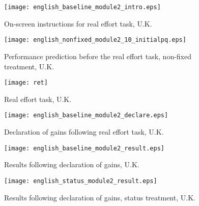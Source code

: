 \documentclass[12pt]{article}
\begin{document}
\clearpage

\begin{figure}[ht]
\centerline{\texttt{[image: english\_baseline\_module2\_intro.eps]}}
\caption{On-screen instructions for real effort task, U.K.}
\end{figure}

\vspace{1cm}

\begin{figure}[ht]
\centerline{\texttt{[image: english\_nonfixed\_module2\_10\_initialpq.eps]}}
\caption{Performance prediction before the real effort task, non-fixed treatment, U.K.}
\end{figure}


\clearpage



\begin{figure}[ht]
\centerline{\texttt{[image: ret]}}
\caption{Real effort task, U.K.}
\end{figure}
\clearpage

\begin{comment}
\begin{figure}[ht]
\centerline{\texttt{[image: RETresponse]}}
\caption{Real effort task screen with correct answer, U.K.}
\end{figure}
\clearpage
\end{comment}

\begin{figure}[ht]
\centerline{\texttt{[image: english\_baseline\_module2\_declare.eps]}}
\caption{Declaration of gains following real effort task, U.K.}
\end{figure}

\vspace{1cm}

\begin{figure}[ht]
\centerline{\texttt{[image: english\_baseline\_module2\_result.eps]}}
\caption{Results following declaration of gains, U.K.}
\end{figure}


\clearpage

\begin{figure}[ht]
\centerline{\texttt{[image: english\_status\_module2\_result.eps]}}
\caption{Results following declaration of gains, status treatment, U.K.}
\end{figure}

\vspace{1cm}
\end{document}
